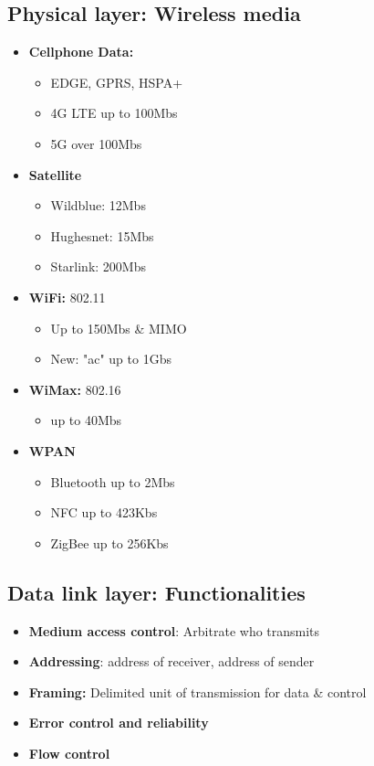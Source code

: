 \documentclass{report}
\begin{document}
     \subsection{Physical layer: Wireless media}
     \begin{itemize}
         \item \textbf{Cellphone Data:}
             \begin{itemize}
                 \item EDGE, GPRS, HSPA+
                    \item 4G LTE up to 100Mbs
                    \item 5G over 100Mbs
             \end{itemize}
            \item \textbf{Satellite}
                \begin{itemize}
                    \item Wildblue: 12Mbs
                    \item Hughesnet: 15Mbs
                    \item Starlink: 200Mbs
                \end{itemize}
            \item \textbf{WiFi:} 802.11
                \begin{itemize}
                    \item Up to 150Mbs \& MIMO
                    \item New: "ac" up to 1Gbs
                \end{itemize}
            \item \textbf{WiMax:} 802.16
                \begin{itemize}
                    \item up to 40Mbs
                \end{itemize}
            \item \textbf{WPAN}
                \begin{itemize}
                    \item Bluetooth up to 2Mbs
                    \item NFC up to 423Kbs
                    \item ZigBee up to 256Kbs
                \end{itemize}
     \end{itemize}
     
     \bigbreak \noindent 
     \subsection{Data link layer: Functionalities}
     \begin{itemize}
         \item \textbf{Medium access control}: Arbitrate who transmits
            \item \textbf{Addressing}: address of receiver, address of sender
            \item \textbf{Framing:} Delimited  unit of transmission for data \& control
            \item \textbf{Error control and reliability} 
            \item \textbf{Flow control}
     \end{itemize}
     \bigbreak \noindent 
\end{document}
